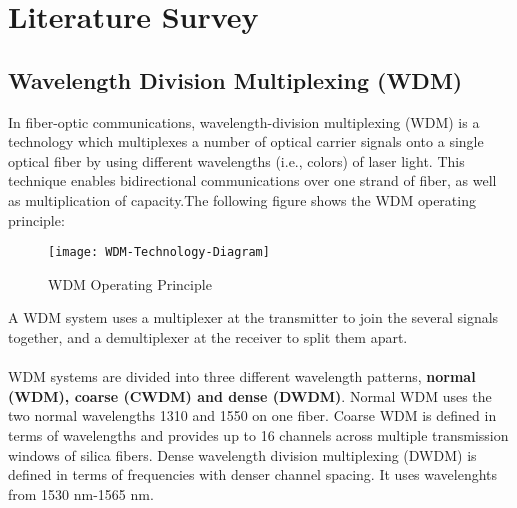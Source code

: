 \documentclass[hidelinks, 12pt]{report}
\begin{document}
\chapter{Literature Survey}
\justify
\section{Wavelength Division Multiplexing (WDM)}
In fiber-optic communications, wavelength-division multiplexing (WDM) is a technology which multiplexes a number of optical carrier signals onto a single optical fiber by using different wavelengths (i.e., colors) of laser light. This technique enables bidirectional communications over one strand of fiber, as well as multiplication of capacity.The following figure shows the WDM operating principle:
\begin{figure}[H]
\centering
\texttt{[image: WDM-Technology-Diagram]}
\caption[WDM Operating Principle]{WDM Operating Principle}
\label{WDM Operating Principle}
\end{figure}
A WDM system uses a multiplexer at the transmitter to join the several signals together, and a demultiplexer at the receiver to split them apart.\\
\\WDM systems are divided into three different wavelength patterns, \textbf{normal (WDM), coarse (CWDM) and dense (DWDM)}. Normal WDM uses the two normal wavelengths 1310 and 1550 on one fiber. Coarse WDM is defined in terms of wavelengths and provides up to 16 channels across multiple transmission windows of silica fibers. Dense wavelength division multiplexing (DWDM) is defined in terms of frequencies with denser channel spacing.  It uses wavelenghts from 1530 nm-1565 nm.
\end{document}
